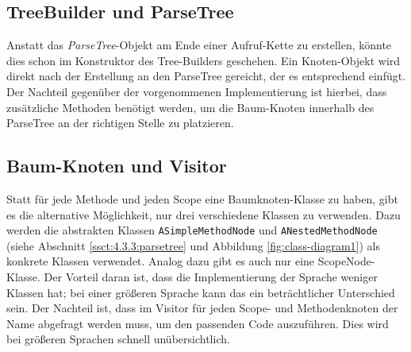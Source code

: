 \subsection{TreeBuilder und ParseTree}\label{ssct:4.4.1:alt-treebuilder-parsetree}
Anstatt das \emph{ParseTree}-Objekt am Ende einer Aufruf-Kette zu erstellen, könnte dies schon im Konstruktor des Tree-Builders geschehen. Ein Knoten-Objekt wird direkt nach der Erstellung an den ParseTree gereicht, der es entsprechend einfügt. Der Nachteil gegenüber der vorgenommenen Implementierung ist hierbei, dass zusätzliche Methoden benötigt werden, um die Baum-Knoten innerhalb des ParseTree an der richtigen Stelle zu platzieren.

\subsection{Baum-Knoten und Visitor}\label{ssct:4.4.2:alt-knoten-visitor}
Statt für jede Methode und jeden Scope eine Baumknoten-Klasse zu haben, gibt es die alternative Möglichkeit, nur drei verschiedene Klassen zu verwenden. Dazu werden die abstrakten Klassen \texttt{ASimpleMethodNode} und \texttt{ANestedMethodNode} (siehe Abschnitt \ref{ssct:4.3.3:parsetree} und Abbildung \ref{fig:class-diagram1}) als konkrete Klassen verwendet. Analog dazu gibt es auch nur eine ScopeNode-Klasse. Der Vorteil daran ist, dass die Implementierung der Sprache weniger Klassen hat; bei einer größeren Sprache kann das ein beträchtlicher Unterschied sein. Der Nachteil ist, dass im Visitor für jeden Scope- und Methodenknoten der Name abgefragt werden muss, um den passenden Code auszuführen. Dies wird bei größeren Sprachen schnell unübersichtlich.